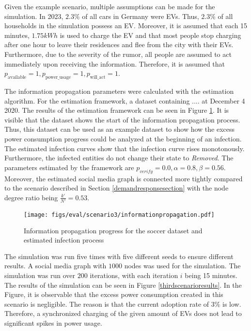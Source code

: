 Given the example scenario, multiple assumptions can
be made for the simulation. In 2023, $2.3\%$ of all cars in Germany were 
EVs. Thus, $2.3\%$ of all households in the simulation
possess an EV. Moreover, it is assumed that 
each 15 minutes, $1.75kWh$ is used to charge the EV 
and that most people stop charging after one hour
to leave their residences and flee from the city with their EVs.
Furthermore, due to the severity of the rumor,
all people are assumed to act immediately upon 
receiving the information. Therefore, it is assumed 
that $p_{\mathrm{available}}=1, 
p_{\mathrm{power\_usage}}=1, p_{\mathrm{will\_act}}=1$.

The information propagation parameters were calculated with 
the estimation algorithm. For the estimation framework, a 
dataset containing .... at December 4 2020.
The results of the estimation framework can be seen in 
Figure \ref{geoloctweet}. It is visible that the dataset 
shows the start of the information propagation process.
Thus, this dataset can be used as an example dataset 
to show how the excess power consumption progress 
could be analyzed at the beginning of an infection.
The estimated infection curves show that the infection
curve rises monotonously. Furthermore, the infected 
entities do not change their state to \textit{Removed}.
The parameters estimated by the framework are 
$p_{verify}= 0.0, \alpha = 0.8, \beta = 0.56$.
Moreover, the estimated social media graph is 
connected more tightly compared to the 
scenario described in Section \ref{demandresponsesection} 
with the node degree ratio being 
$\frac{k'}{N'}=0.53$. 

\begin{figure}[!ht]
    \center
    \texttt{[image: figs/eval/scenario3/informationpropagation.pdf]}
    \caption{Information propagation progress for the soccer dataset 
    and estimated infection process}
    \label{geoloctweet}
\end{figure}

The simulation was run five times with five 
different seeds to ensure different results. 
A social media graph with $1000$ nodes was used
for the simulation. 
The simulation was run over $200$ iterations, with each
iteration $i$ being 15 minutes.
The results of the simulation can be 
seen in Figure \ref{thirdscenarioresults}. In the Figure,
it is observable that the excess power consumption created 
in this scenario is negligible. The reason is that the 
current adoption rate of $3\%$ is low. Therefore, a 
synchronized charging of the given amount of EVs does not
lead to significant spikes in power usage.

